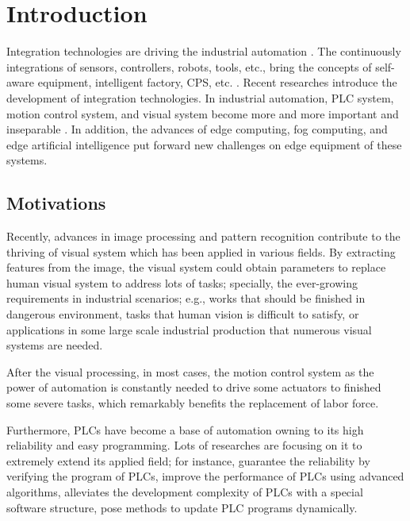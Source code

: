 \documentclass[journal,UTF8]{IEEEtran}
\begin{document}
\section{Introduction}
Integration technologies are driving the industrial automation \cite{Kazmierkowski2007Integration}. The continuously integrations of sensors, controllers, robots, tools, etc., bring the concepts of self-aware equipment, intelligent factory, CPS, etc. \cite{Wan2018An,Chekired2018Industrial}. Recent researches \cite{Colombo2006An,Vaccaro2010An,Dean2017Integration} introduce the development of integration technologies. In industrial automation, PLC system,  motion control system, and visual system become more and more important and inseparable \cite{Feng2002Integrating,Chang2006Motion,Feng2005Practical}. In addition, the advances of edge computing, fog computing, and edge artificial intelligence \cite{Hu2017Fog,Hou2018Green,PaceAn} put forward new challenges on edge equipment of these systems.

\subsection{Motivations}
Recently, advances in image processing and pattern recognition contribute to the thriving of visual system which has been applied in various fields. By extracting features from the image, the visual system could obtain parameters to replace human visual system to address lots of tasks; specially, the ever-growing requirements in industrial scenarios; e.g., works that should be finished in dangerous environment, tasks that human vision is difficult to satisfy, or applications in some large scale industrial production that numerous visual systems are needed. 

After the visual processing, in most cases, the motion control system as the power of automation is constantly needed to drive some actuators to finished some severe tasks, which remarkably benefits the replacement of labor force. 

Furthermore, PLCs have become a base of automation owning to its high reliability and easy programming\cite{Hossain2014Advanced}. Lots of researches are focusing on it to extremely extend its applied field; for instance, \cite{Jiang2013System,Jiang2013Bayesian} guarantee the reliability by verifying the program of PLCs, \cite{Gerk2006Advanced,Dominic2016PLC} improve the performance of PLCs using advanced algorithms, \cite{wu2018customized} alleviates the development complexity of PLCs with a special software structure, \cite{Sch2013Development} pose methods to update PLC programs dynamically.
\end{document}
